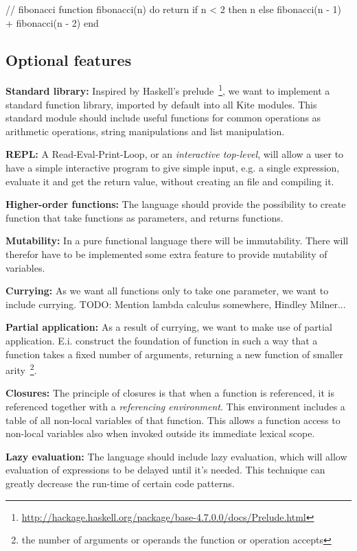 \begin{pseudo}
// fibonacci
function fibonacci(n) do
  return if n < 2
    then n
    else fibonacci(n - 1) + fibonacci(n - 2)
end
\end{pseudo}


\subsection{Optional features}

\textbf{Standard library:}
Inspired by Haskell's prelude~\footnote{\url{http://hackage.haskell.org/package/base-4.7.0.0/docs/Prelude.html}}, we want to implement a standard function library, imported by default into all Kite modules. This standard module should include useful functions for common operations as arithmetic operations, string manipulations and list manipulation.

\textbf{REPL:}
A Read-Eval-Print-Loop, or an \emph{interactive top-level}, will allow a user to have a simple interactive program to give simple input, e.g. a single expression, evaluate it and get the return value, without creating an file and compiling it.

\textbf{Higher-order functions:}
The language should provide the possibility to create function that take functions as parameters, and returns functions.

\textbf{Mutability:}
In a pure functional language there will be immutability. There will therefor have to be implemented some extra feature to provide mutability of variables.

\textbf{Currying:}
As we want all functions only to take one parameter, we want to include currying.
TODO: Mention lambda calculus somewhere, Hindley Milner...

\textbf{Partial application:}
As a result of currying, we want to make use of partial application. E.i. construct the foundation of function in such a way that a function takes a fixed number of arguments, returning a new function of smaller arity~\footnote{the number of arguments or operands the function or operation accepts}.

\textbf{Closures:}
The principle of closures is that when a function is referenced, it is referenced together with a \emph{referencing environment}. This environment includes a table of all non-local variables of that function. This allows a function access to non-local  variables also when invoked outside its immediate lexical scope.

\textbf{Lazy evaluation:}
The language should include lazy evaluation, which will allow evaluation of expressions to be delayed until it's needed. This technique can greatly decrease the run-time of certain code patterns.

